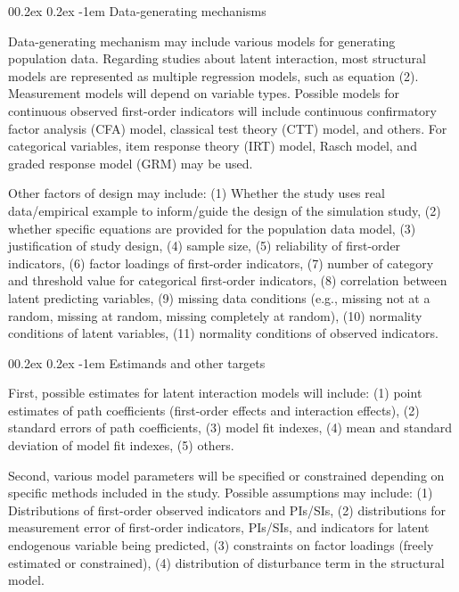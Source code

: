 \documentclass[
  man]{apa6}
\makeatletter
\let\oldparagraph\paragraph
\renewcommand{\paragraph}[1]{\oldparagraph{#1}\mbox{}}
\renewcommand{\paragraph}{\@startsection{paragraph}{4}{\parindent}%
  {0\baselineskip \@plus 0.2ex \@minus 0.2ex}%
  {-1em}%
  {\normalfont\normalsize\bfseries\itshape\typesectitle}}
\makeatother
\begin{document}
\hypertarget{data-generating-mechanisms}{%
\paragraph{Data-generating mechanisms}\label{data-generating-mechanisms}}

Data-generating mechanism may include various models for generating population data. Regarding studies about latent interaction, most structural models are represented as multiple regression models, such as equation (2). Measurement models will depend on variable types. Possible models for continuous observed first-order indicators will include continuous confirmatory factor analysis (CFA) model, classical test theory (CTT) model, and others. For categorical variables, item response theory (IRT) model, Rasch model, and graded response model (GRM) may be used.

Other factors of design may include: (1) Whether the study uses real data/empirical example to inform/guide the design of the simulation study, (2) whether specific equations are provided for the population data model, (3) justification of study design, (4) sample size, (5) reliability of first-order indicators, (6) factor loadings of first-order indicators, (7) number of category and threshold value for categorical first-order indicators, (8) correlation between latent predicting variables, (9) missing data conditions (e.g., missing not at a random, missing at random, missing completely at random), (10) normality conditions of latent variables, (11) normality conditions of observed indicators.

\hypertarget{estimands-and-other-targets}{%
\paragraph{Estimands and other targets}\label{estimands-and-other-targets}}

First, possible estimates for latent interaction models will include: (1) point estimates of path coefficients (first-order effects and interaction effects), (2) standard errors of path coefficients, (3) model fit indexes, (4) mean and standard deviation of model fit indexes, (5) others.

Second, various model parameters will be specified or constrained depending on specific methods included in the study. Possible assumptions may include: (1) Distributions of first-order observed indicators and PIs/SIs, (2) distributions for measurement error of first-order indicators, PIs/SIs, and indicators for latent endogenous variable being predicted, (3) constraints on factor loadings (freely estimated or constrained), (4) distribution of disturbance term in the structural model.
\end{document}
